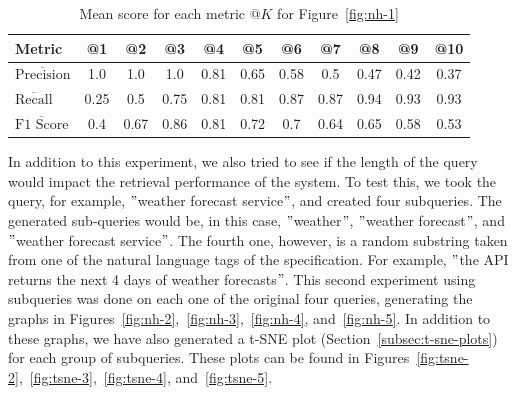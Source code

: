 \begin{table}[!h]
    \begin{center}
        \begin{tabular}{l c c c c c c c c c c}
            \hline
            \textbf{Metric} & \textbf{@1} & \textbf{@2} & \textbf{@3} & \textbf{@4} & \textbf{@5} & \textbf{@6} & \textbf{@7} & \textbf{@8} & \textbf{@9} & \textbf{@10} \\ \hline
            $\overline{\text{Precision}}$ & 1.0 & 1.0 & 1.0 & 0.81 & 0.65 & 0.58 & 0.5 & 0.47 & 0.42 & 0.37 \\
            $\overline{\text{Recall}}$ & 0.25 & 0.5 & 0.75 & 0.81 & 0.81 & 0.87 & 0.87 & 0.94 & 0.93 & 0.93 \\
            $\overline{\text{F1 Score}}$ & 0.4 & 0.67 & 0.86 & 0.81 & 0.72 & 0.7 & 0.64 & 0.65 & 0.58 & 0.53 \\ \hline
        \end{tabular}
    \end{center}

    \caption{Mean score for each metric $@K$ for Figure~\ref{fig:nh-1}}
    \label{tab:metrics-prf}
\end{table}

\noindent In addition to this experiment, we also tried to see if the length of the query would impact the retrieval performance of the system.
To test this, we took the query, for example, \("\)weather forecast service\("\), and created four subqueries.
The generated sub-queries would be, in this case, \("\)weather\("\), \("\)weather forecast\("\), and \("\)weather forecast service\("\).
The fourth one, however, is a random substring taken from one of the natural language tags of the specification.
For example, \("\)the API returns the next 4 days of weather forecasts\("\).
This second experiment using subqueries was done on each one of the original four queries, generating the graphs in Figures~\ref{fig:nh-2},~\ref{fig:nh-3},~\ref{fig:nh-4}, and~\ref{fig:nh-5}.
In addition to these graphs, we have also generated a t-SNE plot (Section~\ref{subsec:t-sne-plots}) for each group of subqueries.
These plots can be found in Figures~\ref{fig:tsne-2},~\ref{fig:tsne-3},~\ref{fig:tsne-4}, and~\ref{fig:tsne-5}.

